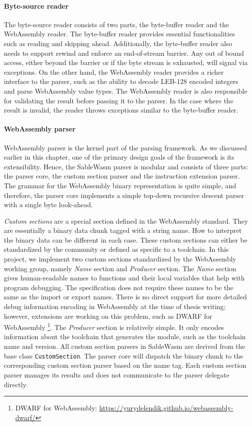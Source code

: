 \paragraph{Byte-source reader}
The byte-source reader consists of two parts, the byte-buffer reader and the
WebAssembly reader. The byte-buffer reader provides essential functionalities
such as reading and skipping ahead. Additionally, the byte-buffer reader also
needs to support rewind and enforce an end-of-stream barrier. Any out of bound
access, either beyond the barrier or if the byte stream is exhausted, will
signal via exceptions. On the other hand, the WebAssembly reader provides a
richer interface to the parser, such as the ability to decode LEB-128 encoded
integers and parse WebAssembly value types. The WebAssembly reader is also
responsible for validating the result before passing it to the parser. In the
case where the result is invalid, the reader throws exceptions similar to the
byte-buffer reader.

\paragraph{WebAssembly parser}
WebAssembly parser is the kernel part of the parsing framework. As we discussed
earlier in this chapter, one of the primary design goals of the framework is its
extensibility. Hence, the SableWasm parser is modular and consists of three
parts: the parser core, the custom section parser and the instruction extension
parser. The grammar for the WebAssembly binary representation is quite simple,
and therefore, the parser core implements a simple top-down recursive descent
parser with a single byte look-ahead.

\emph{Custom sections} are a special section defined in the WebAssembly
standard. They are essentially a binary data chunk tagged with a string name.
How to interpret the binary data can be different in each case. These custom
sections can either be standardized by the community or defined as specific to a
toolchain. In this project, we implement two custom sections standardized by the
WebAssembly working group, namely \emph{Name} section and \emph{Producer}
section. The \emph{Name} section gives human-readable names to functions and
their local variables that help with program debugging. The specification does
not require these names to be the same as the import or export names. There is
no direct support for more detailed debug information encoding in WebAssembly at
the time of thesis writing; however, extensions are working on this problem,
such as DWARF for WebAssembly \footnote{DWARF for WebAssembly:
  \url{https://yurydelendik.github.io/webassembly-dwarf/}}. The \emph{Producer}
section is relatively simple. It only encodes information about the toolchain
that generates the module, such as the toolchain name and version. All custom
section parsers in SableWasm are derived from the base class
\texttt{CustomSection}. The parser core will dispatch the binary chunk to the
corresponding custom section parser based on the name tag. Each custom section
parser manages its results and does not communicate to the parser delegate
directly.

